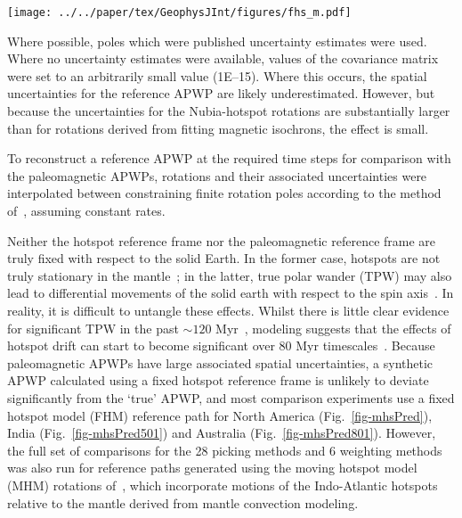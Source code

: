 \begin{figure*}
\centering
\texttt{[image: ../../paper/tex/GeophysJInt/figures/fhs\_m.pdf]}
\caption[120 Ma MHM vs FHM predicted APWP of North America]{MHM
predicted 120 Ma APWP (solid line) for $NAC$ through the North
America\textendash{}Nubia\textendash{}Mantle plate circuit. The FHM predicted
path (dashed line with shaded uncertainties) is also shown for comparison. The
age step is 5 Myr. Compared with the 10 Ma paleomagnetic mean pole calculated by
the AMP method (dark triangle), the coeval mean pole derived from the APP method
is closer to both FHM and MHM predicted 10 Ma poles, which indicates more data
diluting the effect of outliers. See also the paleopoles that the two mean poles
are composed of in Fig.~\ref{fig-nac-maplat}.}\label{fig-mhsPred}
\end{figure*}

Where possible, poles which were published uncertainty estimates were used.
Where no uncertainty estimates were available, values of the covariance matrix
were set to an arbitrarily small value (1E–15). Where this occurs, the spatial
uncertainties for the reference APWP are likely underestimated. However, but
because the uncertainties for the Nubia-hotspot rotations are substantially
larger than for rotations derived from fitting magnetic isochrons, the effect is
small.

To reconstruct a reference APWP at the required time steps for comparison with
the paleomagnetic APWPs, rotations and their associated uncertainties were
interpolated between constraining finite rotation poles according to the method
of~\citet{D08}, assuming constant rates.

Neither the hotspot reference frame nor the paleomagnetic reference frame are
truly fixed with respect to the solid Earth. In the former case, hotspots are
not truly stationary in the mantle~\citep{S98}; in the latter, true polar wander
(TPW) may also lead to differential movements of the solid earth with respect to
the spin axis~\citep{E03}. In reality, it is difficult to untangle these
effects. Whilst there is little clear evidence for significant TPW in the past
${\sim}120$ Myr~\citep{C00,R04}, modeling suggests that the effects of hotspot
drift can start to become significant over 80 Myr
timescales~\citep{O05}. Because paleomagnetic APWPs have large associated
spatial uncertainties, a synthetic APWP calculated using a fixed hotspot
reference frame is unlikely to deviate significantly from the `true' APWP, and
most comparison experiments use a fixed hotspot model (FHM) reference path for
North America (Fig.~\ref{fig-mhsPred}), India (Fig.~\ref{fig-mhsPred501}) and
Australia (Fig.~\ref{fig-mhsPred801}). However, the full set of comparisons for
the 28 picking methods and 6 weighting methods was also run for reference paths
generated using the moving hotspot model (MHM) rotations of~\citet{O05}, which
incorporate motions of the Indo-Atlantic hotspots relative to the mantle derived
from mantle convection modeling.


